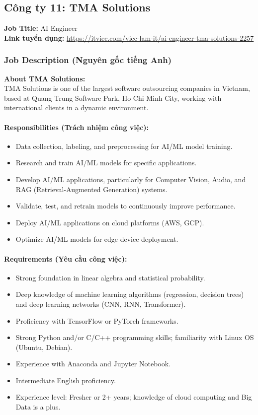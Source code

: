 \subsection{Công ty 11: TMA Solutions}

\noindent\textbf{Job Title:} AI Engineer \\
\textbf{Link tuyển dụng:} \url{https://itviec.com/viec-lam-it/ai-engineer-tma-solutions-2257}

\subsubsection*{Job Description (Nguyên gốc tiếng Anh)}

\textbf{About TMA Solutions:} \\
\indent TMA Solutions is one of the largest software outsourcing companies in Vietnam, based at Quang Trung Software Park, Ho Chi Minh City, working with international clients in a dynamic environment.

\paragraph{Responsibilities (Trách nhiệm công việc):}
\begin{itemize}
    \item Data collection, labeling, and preprocessing for AI/ML model training.
    \item Research and train AI/ML models for specific applications.
    \item Develop AI/ML applications, particularly for Computer Vision, Audio, and RAG (Retrieval-Augmented Generation) systems.
    \item Validate, test, and retrain models to continuously improve performance.
    \item Deploy AI/ML applications on cloud platforms (AWS, GCP).
    \item Optimize AI/ML models for edge device deployment.
\end{itemize}

\paragraph{Requirements (Yêu cầu công việc):}
\begin{itemize}
    \item Strong foundation in linear algebra and statistical probability.
    \item Deep knowledge of machine learning algorithms (regression, decision trees) and deep learning networks (CNN, RNN, Transformer).
    \item Proficiency with TensorFlow or PyTorch frameworks.
    \item Strong Python and/or C/C++ programming skills; familiarity with Linux OS (Ubuntu, Debian).
    \item Experience with Anaconda and Jupyter Notebook.
    \item Intermediate English proficiency.
    \item Experience level: Fresher or 2+ years; knowledge of cloud computing and Big Data is a plus.
\end{itemize}
